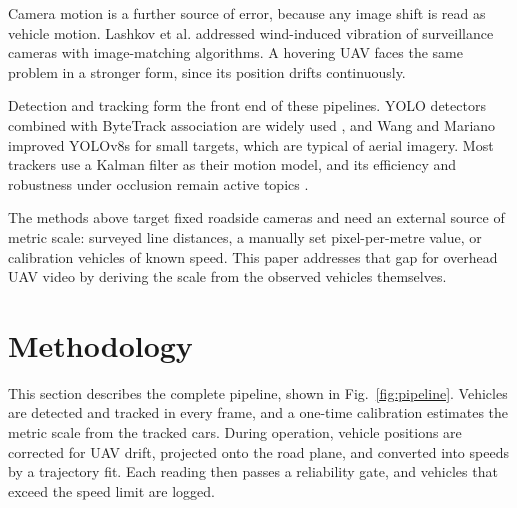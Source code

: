 \documentclass[conference]{IEEEtran}
\begin{document}
Camera motion is a further source of error, because any image shift is read as vehicle motion. Lashkov et al. \cite{ref5} addressed wind-induced vibration of surveillance cameras with image-matching algorithms. A hovering UAV faces the same problem in a stronger form, since its position drifts continuously.

Detection and tracking form the front end of these pipelines. YOLO detectors combined with ByteTrack association are widely used \cite{ref1,ref3,ref6}, and Wang and Mariano \cite{ref6} improved YOLOv8s for small targets, which are typical of aerial imagery. Most trackers use a Kalman filter as their motion model, and its efficiency and robustness under occlusion remain active topics \cite{ref7}.

The methods above target fixed roadside cameras and need an external source of metric scale: surveyed line distances, a manually set pixel-per-metre value, or calibration vehicles of known speed. This paper addresses that gap for overhead UAV video by deriving the scale from the observed vehicles themselves.

\section{Methodology}

This section describes the complete pipeline, shown in Fig.~\ref{fig:pipeline}. Vehicles are detected and tracked in every frame, and a one-time calibration estimates the metric scale from the tracked cars. During operation, vehicle positions are corrected for UAV drift, projected onto the road plane, and converted into speeds by a trajectory fit. Each reading then passes a reliability gate, and vehicles that exceed the speed limit are logged.
\end{document}
